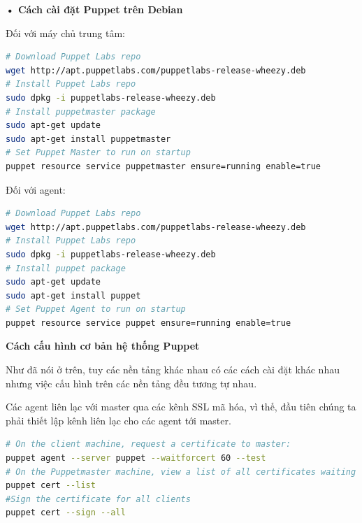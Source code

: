 \newpage
\clearpage

\textbf{• Cách cài đặt Puppet trên Debian}

Đối với máy chủ trung tâm:

\begin{lstlisting}[label={lst:puppet_install_master_debian},caption={Cách cài đặt puppet master trên Debian}, language=bash, deletekeywords={enable, true}]
# Download Puppet Labs repo
wget http://apt.puppetlabs.com/puppetlabs-release-wheezy.deb
# Install Puppet Labs repo
sudo dpkg -i puppetlabs-release-wheezy.deb
# Install puppetmaster package
sudo apt-get update
sudo apt-get install puppetmaster
# Set Puppet Master to run on startup
puppet resource service puppetmaster ensure=running enable=true
\end{lstlisting}

Đối với agent:

\begin{lstlisting}[label={lst:puppet_install_agent_debian},caption={Cách cài đặt puppet agent trên Debian}, language=bash, deletekeywords={enable, true}]
# Download Puppet Labs repo
wget http://apt.puppetlabs.com/puppetlabs-release-wheezy.deb
# Install Puppet Labs repo
sudo dpkg -i puppetlabs-release-wheezy.deb
# Install puppet package
sudo apt-get update
sudo apt-get install puppet
# Set Puppet Agent to run on startup
puppet resource service puppet ensure=running enable=true
\end{lstlisting}

\textbf{\large Cách cấu hình cơ bản hệ thống Puppet}

Như đã nói ở trên, tuy các nền tảng khác nhau có các cách cài đặt khác nhau nhưng việc cấu hình trên các nền tảng đều tương tự nhau.

Các agent liên lạc với master qua các kênh SSL mã hóa, vì thế, đầu tiên chúng ta phải thiết lập kênh liên lạc cho các agent tới master.

\newpage
\clearpage

\begin{lstlisting}[label={lst:puppet_config_ssl},caption={Thiết lập kết nối qua kênh SSL}, language=bash, deletekeywords={test}]
# On the client machine, request a certificate to master:
puppet agent --server puppet --waitforcert 60 --test
# On the Puppetmaster machine, view a list of all certificates waiting to be signed:
puppet cert --list
#Sign the certificate for all clients
puppet cert --sign --all
\end{lstlisting}

